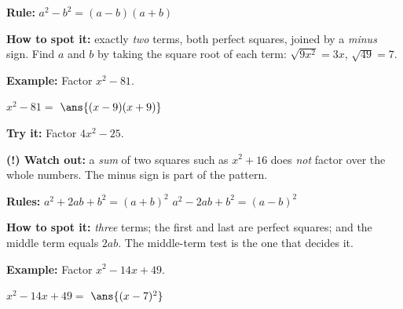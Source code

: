 \documentclass[12pt]{article}
\begin{document}


\begin{formulabox}
\textbf{Rule:} \quad $a^2 - b^2 = (a-b)(a+b)$\par\smallskip
\textbf{How to spot it:} exactly \emph{two} terms, both perfect squares, joined by a \emph{minus} sign. Find $a$ and $b$ by taking the square root of each term: $\sqrt{9x^2} = 3x$, $\sqrt{49} = 7$.
\end{formulabox}

\begin{examplebox}
\textbf{Example:} \quad Factor $x^2 - 81$.
\par
$x^2 - 81 = $ $\ans{(x-9)(x+9)}$
\end{examplebox}

\begin{tryitbox}
\textbf{Try it:} \quad Factor $4x^2 - 25$.\\[2pt]
\end{tryitbox}

\begin{watchoutbox}
\textbf{(!) Watch out:} a \emph{sum} of two squares such as $x^2 + 16$ does \emph{not} factor over the whole numbers. The minus sign is part of the pattern.
\end{watchoutbox}


\begin{formulabox}
\textbf{Rules:} \quad $a^2 + 2ab + b^2 = (a+b)^2$ \qquad $a^2 - 2ab + b^2 = (a-b)^2$\par\smallskip
\textbf{How to spot it:} \emph{three} terms; the first and last are perfect squares; and the middle term equals $2ab$. The middle-term test is the one that decides it.
\end{formulabox}

\begin{examplebox}
\textbf{Example:} \quad Factor $x^2 - 14x + 49$.
\par
$x^2 - 14x + 49 = $ $\ans{(x-7)^2}$
\end{examplebox}
\end{document}
